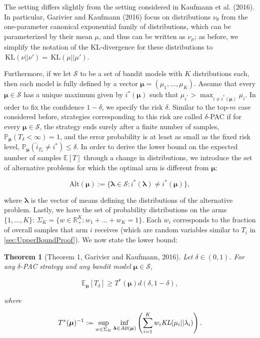 \documentclass[11pt,]{article}
\newtheorem{theorem}{Theorem}
\newcommand{\KL}{\,\text{KL}}
\begin{document}
The setting differs slightly from the setting considered in Kaufmann et
al. (2016). In particular, Garivier and Kaufmann (2016) focus on
distributions \(\nu_{\theta}\) from the one-parameter canonical
exponential family of distributions, which can be parameterized by their
mean \(\mu\), and thus can be written as \(\nu_{\mu}\); as before, we
simplify the notation of the KL-divergence for these distributions to
\(\KL(\nu || \nu') = \KL(\mu || \mu')\).

Furthermore, if we let \(\mathcal{S}\) to be a set of bandit models with
\(K\) distributions each, then each model is fully defined by a vector
\(\bm{\mu} = (\mu_1, \dots, \mu_K)\). Assume that every
\(\bm{\mu} \in \mathcal{S}\) has a unique maximum given by
\(i^*(\bm{\mu})\) such that
\(\mu_{i^*} > \max_{i \neq i^*(\bm{\mu})} \mu_i\). In order to fix the
confidence \(1-\delta\), we specify the risk \(\delta\). Similar to the
top-\(m\) case considered before, strategies corresponding to this risk
are called \(\delta\)-PAC if for every \(\bm{\mu} \in \mathcal{S}\), the
strategy ends surely after a finite number of samples,
\(\mathbb{P}_{\bm{\mu}}(T_{\delta} < \infty) = 1\), and the error
probability is at least as small as the fixed risk level,
\(\mathbb{P}_{\bm{\mu}}(\hat{i}_{T_{\delta}} \neq i^*) \leq \delta\). In
order to derive the lower bound on the expected number of samples
\(\mathbb{E}[T]\) through a change in distributions, we introduce the
set of alternative problems for which the optimal arm is different from
\(\bm{\mu}\):

\begin{equation*}
\text{Alt}(\bm{\mu}) := \{\bm{\lambda} \in \mathcal{S}: i^*(\bm{\lambda}) \neq i^*(\bm{\mu})\},
\end{equation*}

where \(\bm{\lambda}\) is the vector of means defining the distributions
of the alternative problem. Lastly, we have the set of probability
distributions on the arms \(\{1,...,K\}\):
\(\Sigma_K = \{w \in \mathbb{R}_{+}^K: w_1 + \dots + w_K = 1\}\). Each
\(w_i\) corresponds to the fraction of overall samples that arm \(i\)
receives (which are random variables similar to \(T_i\) in
\autoref{sec:UpperBoundProof}). We now state the lower bound:

\begin{theorem}[Theorem 1, Garivier and Kaufmann, 2016] \label{theorem:GarivierKaufmannTheorem1}
Let $\delta \in (0,1)$. For any $\delta$-PAC strategy and any bandit model $\bm{\mu} \in \mathcal{S}$,

\begin{equation*}
\mathbb{E}_{\bm{\mu}} [T_{\delta}] \geq T^*(\bm{\mu}) d(\delta,1-\delta),
\end{equation*}

where 

\begin{equation} \label{eq:GarivierKaufmann_Theorem1_Game}
T^*(\bm{\mu})^{-1} := \sup_{w \in \Sigma_K} \inf_{\bm{\lambda} \in \text{\em{Alt}}(\bm{\mu})} \left( \sum_{i=1}^K w_i \text{\em{KL}}(\mu_i|| \lambda_i)\right).
\end{equation}
\end{theorem}
\end{document}

